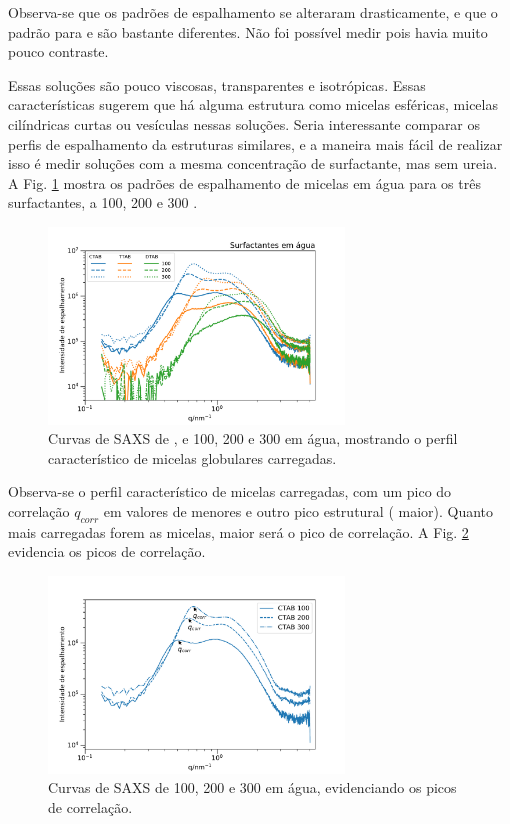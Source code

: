 	Observa-se que os padrões de espalhamento se alteraram drasticamente, e que o padrão para \CTAB{} e \TTAB{} são bastante diferentes. Não foi possível medir \DTAB{} pois havia muito pouco contraste.
	
	Essas soluções são pouco viscosas, transparentes e isotrópicas. Essas características sugerem que há alguma estrutura como micelas esféricas, micelas cilíndricas curtas ou vesículas nessas soluções. Seria interessante comparar os perfis de espalhamento da estruturas similares, e a maneira mais fácil de realizar isso é medir soluções com a mesma concentração de surfactante, mas sem ureia. A Fig. \ref{fig:SAXS_micelas_esfericas} mostra os padrões de espalhamento de micelas em água para os três surfactantes, a 100, 200 e 300 \mM.
	
	\begin{figure}[h]
		\centering
		\includegraphics[width=0.7\textwidth]{imagens/saxs/micelas_esfericas}
		\caption{Curvas de SAXS de \CTAB, \TTAB{} e \DTAB{} 100, 200 e 300 \mM{} em água, mostrando o perfil característico de micelas globulares carregadas.}
		\label{fig:SAXS_micelas_esfericas}
	\end{figure}  %
	
	Observa-se o perfil característico de micelas carregadas, com um pico do correlação \(q_{corr}\) em valores de \q{} menores e outro pico estrutural (\q{} maior). Quanto mais carregadas forem as micelas, maior será o pico de correlação. A Fig. \ref{fig:SAXS_ctab_q_corrs} evidencia os picos de correlação. 
	
	\begin{figure}[h]
		\centering
		\includegraphics[width=0.7\textwidth]{imagens/saxs/CTAB_q_corrs}
		\caption{Curvas de SAXS de \CTAB{} 100, 200 e 300 \mM{} em água, evidenciando os picos de correlação.}
		\label{fig:SAXS_ctab_q_corrs}
	\end{figure}

